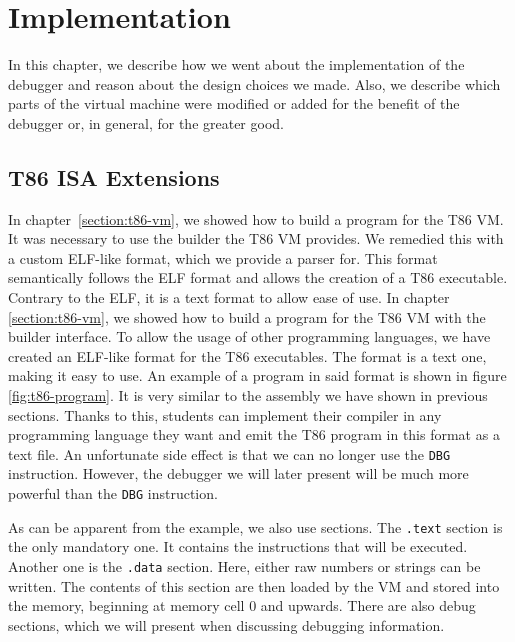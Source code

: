 \chapter{Implementation}
In this chapter, we describe how we went about the implementation of the
debugger and reason about the design choices we made. Also, we describe which
parts of the virtual machine were modified or added for the benefit of the
debugger or, in general, for the greater good.

\section{T86 ISA Extensions}\label{section:parser}
In chapter~\ref{section:t86-vm}, we showed how to build a program for the T86
VM. It was necessary to use the builder the T86 VM provides. We remedied this
with a custom ELF-like format, which we provide a parser for. This format
semantically follows the ELF format and allows the creation of a T86
executable. Contrary to the ELF, it is a text format to allow ease of use. In
chapter \ref{section:t86-vm}, we showed how to build a program for the T86 VM
with the builder interface. To allow the usage of other programming languages,
we have created an ELF-like format for the T86 executables. The format is a
text one, making it easy to use. An example of a program in said format is
shown in figure \ref{fig:t86-program}. It is very similar to the assembly we
have shown in previous sections. Thanks to this, students can implement their
compiler in any programming language they want and emit the T86 program in this
format as a text file. An unfortunate side effect is that we can no longer use
the \texttt{DBG} instruction. However, the debugger we will later present will
be much more powerful than the \texttt{DBG} instruction.

As can be apparent from the example, we also use sections. The \texttt{.text}
section is the only mandatory one. It contains the instructions that will be
executed. Another one is the \texttt{.data} section. Here, either raw numbers
or strings can be written. The contents of this section are then loaded by the
VM and stored into the memory, beginning at memory cell 0 and upwards. There
are also debug sections, which we will present when discussing debugging
information.


